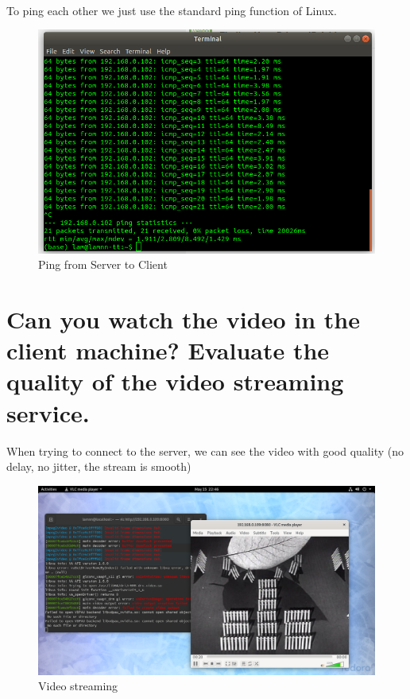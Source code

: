 \documentclass[11pt,a4paper]{article}
\begin{document}
	\\
	To ping each other we just use the standard ping function of Linux.
	\begin{figure}[h!]
  		\includegraphics[width=\linewidth]{ping-to-client.png}
  		\caption{Ping from Server to Client}
  		\label{fig:ping}
	\end{figure}
	
	\section{Can you watch the video in the client machine? Evaluate the quality of the video streaming service.}
	When trying to connect to the server, we can see the video with good quality (no delay, no jitter, the stream is smooth)
	\begin{figure}[h!]
  		\includegraphics[width=\linewidth]{vid-perfect-cond.png}
  		\caption{Video streaming}
  		\label{fig:vid-p-cond}
	\end{figure}
	
\end{document}
